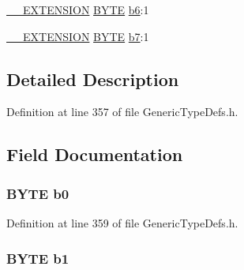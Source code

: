\begin{DoxyCompactItemize}
\item 
\hyperlink{_generic_type_defs_8h_a6f634b0fdcc4febac630fc28e2685ddb}{\+\_\+\+\_\+\+E\+X\+T\+E\+N\+S\+I\+O\+N} \hyperlink{_generic_type_defs_8h_a4ae1dab0fb4b072a66584546209e7d58}{B\+Y\+T\+E} \hyperlink{struct_b_y_t_e___v_a_l_1_1_____p_a_c_k_e_d_a08c152641a8bd5ff9d0f779e362a11d9}{b6}\+:1
\item 
\hyperlink{_generic_type_defs_8h_a6f634b0fdcc4febac630fc28e2685ddb}{\+\_\+\+\_\+\+E\+X\+T\+E\+N\+S\+I\+O\+N} \hyperlink{_generic_type_defs_8h_a4ae1dab0fb4b072a66584546209e7d58}{B\+Y\+T\+E} \hyperlink{struct_b_y_t_e___v_a_l_1_1_____p_a_c_k_e_d_ac7cbdf5792b6143a65ed5a12ace2199e}{b7}\+:1
\end{DoxyCompactItemize}


\subsection{Detailed Description}


Definition at line 357 of file Generic\+Type\+Defs.\+h.



\subsection{Field Documentation}
\hypertarget{struct_b_y_t_e___v_a_l_1_1_____p_a_c_k_e_d_a4010350907c88306a36c21694097c1ca}{}
\subsubsection[{b0}]{ {\bf B\+Y\+T\+E} b0}\label{struct_b_y_t_e___v_a_l_1_1_____p_a_c_k_e_d_a4010350907c88306a36c21694097c1ca}


Definition at line 359 of file Generic\+Type\+Defs.\+h.

\hypertarget{struct_b_y_t_e___v_a_l_1_1_____p_a_c_k_e_d_ae2d2abb492a9ddfdbac2ffbc74c649a8}{}
\subsubsection[{b1}]{ {\bf B\+Y\+T\+E} b1}\label{struct_b_y_t_e___v_a_l_1_1_____p_a_c_k_e_d_ae2d2abb492a9ddfdbac2ffbc74c649a8}



